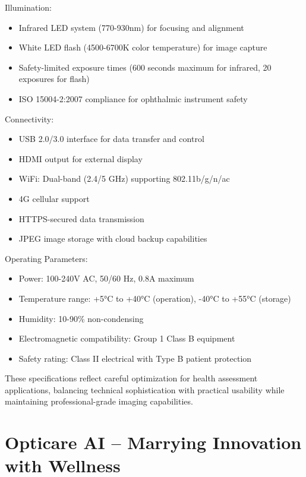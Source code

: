 \documentclass[
  Letterpaper,
]{scrbook}
\providecommand{\tightlist}{%
  \setlength{\itemsep}{0pt}\setlength{\parskip}{0pt}}\usepackage{longtable,booktabs,array}
\begin{document}
Illumination:

\begin{itemize}
\tightlist
\item
  Infrared LED system (770-930nm) for focusing and alignment
\item
  White LED flash (4500-6700K color temperature) for image capture
\item
  Safety-limited exposure times (600 seconds maximum for infrared, 20
  exposures for flash)
\item
  ISO 15004-2:2007 compliance for ophthalmic instrument safety
\end{itemize}

Connectivity:

\begin{itemize}
\tightlist
\item
  USB 2.0/3.0 interface for data transfer and control
\item
  HDMI output for external display
\item
  WiFi: Dual-band (2.4/5 GHz) supporting 802.11b/g/n/ac
\item
  4G cellular support
\item
  HTTPS-secured data transmission
\item
  JPEG image storage with cloud backup capabilities
\end{itemize}

Operating Parameters:

\begin{itemize}
\tightlist
\item
  Power: 100-240V AC, 50/60 Hz, 0.8A maximum
\item
  Temperature range: +5°C to +40°C (operation), -40°C to +55°C (storage)
\item
  Humidity: 10-90\% non-condensing
\item
  Electromagnetic compatibility: Group 1 Class B equipment
\item
  Safety rating: Class II electrical with Type B patient protection
\end{itemize}

These specifications reflect careful optimization for health assessment
applications, balancing technical sophistication with practical
usability while maintaining professional-grade imaging capabilities.


\chapter{Opticare AI -- Marrying Innovation with
Wellness}\label{opticare-ai-marrying-innovation-with-wellness}
\end{document}
